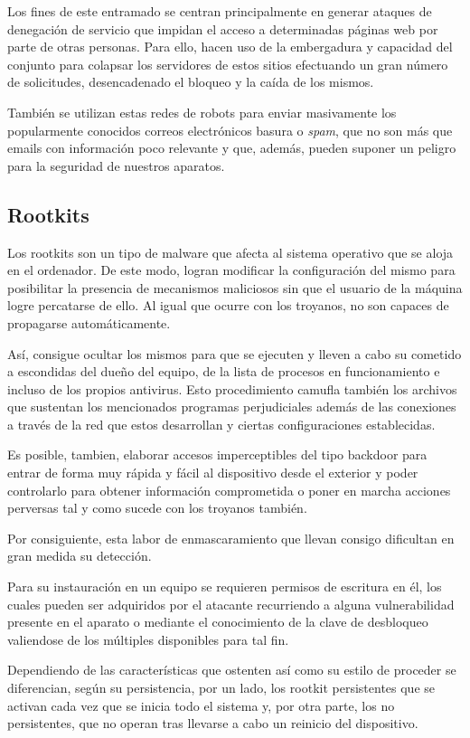 		Los fines de este entramado se centran principalmente en generar ataques de denegación de servicio que impidan el acceso a determinadas páginas web por parte de otras personas. Para ello, hacen uso de la embergadura y capacidad del conjunto para colapsar los servidores de estos sitios efectuando un gran número de solicitudes, desencadenado el bloqueo y la caída de los mismos.

		También se utilizan estas redes de robots para enviar masivamente los popularmente conocidos correos electrónicos basura o \textit{spam}, que no son más que emails con información poco relevante y que, además, pueden suponer un peligro para la seguridad de nuestros aparatos.

	\subsection{Rootkits}
		Los rootkits son un tipo de malware que afecta al sistema operativo que se aloja en el ordenador. De este modo, logran modificar la configuración del mismo para posibilitar la presencia de mecanismos maliciosos sin que el usuario de la máquina logre percatarse de ello. Al igual que ocurre con los troyanos, no son capaces de propagarse automáticamente.

		Así, consigue ocultar los mismos para que se ejecuten y lleven a cabo su cometido a escondidas del dueño del equipo, de la lista de procesos en funcionamiento e incluso de los propios antivirus. Esto procedimiento camufla también los archivos que sustentan los mencionados programas perjudiciales además de las conexiones a través de la red que estos desarrollan y ciertas configuraciones establecidas.

		Es posible, tambien, elaborar accesos imperceptibles del tipo backdoor para entrar de forma muy rápida y fácil al dispositivo desde el exterior y poder controlarlo para obtener información comprometida o poner en marcha acciones perversas tal y como sucede con los troyanos también.

		Por consiguiente, esta labor de enmascaramiento que llevan consigo dificultan en gran medida su detección.

		Para su instauración en un equipo se requieren permisos de escritura en él, los cuales pueden ser adquiridos por el atacante recurriendo a alguna vulnerabilidad presente en el aparato o mediante el conocimiento de la clave de desbloqueo valiendose de los múltiples disponibles para tal fin.

		Dependiendo de las características que ostenten así como su estilo de proceder se diferencian, según su persistencia, por un lado, los rootkit persistentes que se activan cada vez que se inicia todo el sistema y, por otra parte, los no persistentes, que no operan tras llevarse a cabo un reinicio del dispositivo.

